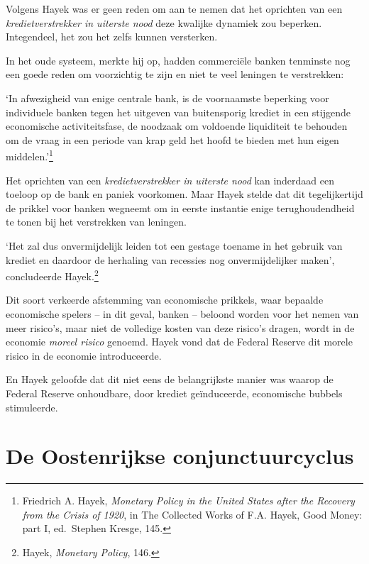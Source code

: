 \documentclass[
  a5paper,
  smalldemyvopaper,11pt,twoside,onecolumn,openright,extrafontsizes,
hidelinks]{memoir}
\renewenvironment{quote}%
               {\list{}{\rightmargin=.3cm\leftmargin=.3cm}%
                \itshape \item[]}%
               {\endlist}
\begin{document}
Volgens Hayek was er geen reden om aan te nemen dat het oprichten van
een \emph{kredietverstrekker in uiterste nood} deze kwalijke dynamiek
zou beperken. Integendeel, het zou het zelfs kunnen versterken.

In het oude systeem, merkte hij op, hadden commerciële banken tenminste
nog een goede reden om voorzichtig te zijn en niet te veel leningen te
verstrekken:

\begin{quote}
`In afwezigheid van enige centrale bank, is de voornaamste beperking
voor individuele banken tegen het uitgeven van buitensporig krediet in
een stijgende economische activiteitsfase, de noodzaak om voldoende
liquiditeit te behouden om de vraag in een periode van krap geld het
hoofd te bieden met hun eigen middelen.'\footnote{\hspace{0pt}Friedrich
  A. Hayek, \emph{Monetary Policy in the United States after the
  Recovery from the Crisis of 1920}, in The Collected Works of F.A.
  Hayek, Good Money: part I, ed.~Stephen Kresge, 145.}
\end{quote}

Het oprichten van een \emph{kredietverstrekker in uiterste nood} kan
inderdaad een toeloop op de bank en paniek voorkomen. Maar Hayek stelde
dat dit tegelijkertijd de prikkel voor banken wegneemt om in eerste
instantie enige terughoudendheid te tonen bij het verstrekken van
leningen.

`Het zal dus onvermijdelijk leiden tot een gestage toename in het
gebruik van krediet en daardoor de herhaling van recessies nog
onvermijdelijker maken', concludeerde Hayek.\footnote{\hspace{0pt}Hayek,
  \emph{Monetary Policy}, 146.}

Dit soort verkeerde afstemming van economische prikkels, waar bepaalde
economische spelers -- in dit geval, banken -- beloond worden voor het
nemen van meer risico's, maar niet de volledige kosten van deze risico's
dragen, wordt in de economie \emph{moreel risico} genoemd. Hayek vond
dat de Federal Reserve dit morele risico in de economie introduceerde.

En Hayek geloofde dat dit niet eens de belangrijkste manier was waarop
de Federal Reserve onhoudbare, door krediet geïnduceerde, economische
bubbels stimuleerde.

\section{De Oostenrijkse
conjunctuurcyclus}\label{de-oostenrijkse-conjunctuurcyclus}
\end{document}
